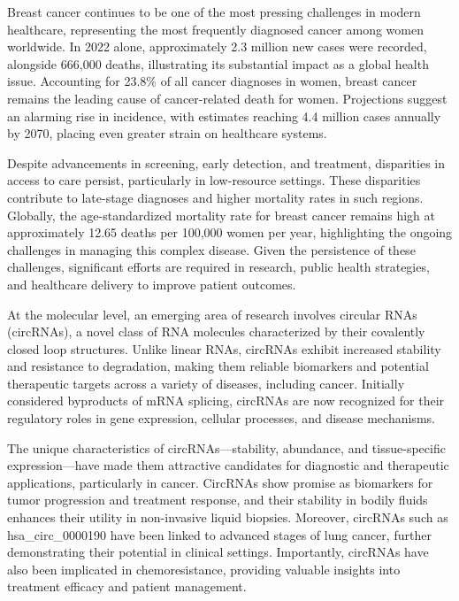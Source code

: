 Breast cancer continues to be one of the most pressing challenges in modern
healthcare, representing the most frequently diagnosed cancer among women
worldwide.
In 2022 alone, approximately 2.3 million new cases were recorded, alongside
666,000 deaths, illustrating its substantial impact as a global health issue.
Accounting for 23.8\% of all cancer diagnoses in
women\supercite{bray_global_2024,ferlay_global_2024}, breast cancer remains the
leading cause of cancer-related death for women.
Projections suggest an alarming rise in incidence, with estimates reaching 4.4
million cases annually by 2070, placing even greater strain on healthcare
systems\supercite{lei_global_2021}.

Despite advancements in screening, early detection, and treatment, disparities
in access to care persist, particularly in low-resource settings.
These disparities contribute to late-stage diagnoses and higher mortality rates
in such regions\supercite{wilkinson_understanding_2022,ginsburg_breast_2020}.
Globally, the age-standardized mortality rate for breast cancer remains high at
approximately 12.65 deaths per 100,000 women per year, highlighting the ongoing
challenges in managing this complex
disease\supercite{bray_global_2024,ferlay_global_2024}.
Given the persistence of these challenges, significant efforts are required in
research, public health strategies, and healthcare delivery to improve patient
outcomes\supercite{desantis_breast_2019}.

At the molecular level, an emerging area of research involves circular RNAs
(circRNAs), a novel class of RNA molecules characterized by their covalently
closed loop structures.
Unlike linear RNAs, circRNAs exhibit increased stability and resistance to
degradation, making them reliable biomarkers and potential therapeutic targets
across a variety of diseases, including
cancer\supercite{ma_circular_2020,hoque_exploring_2023,wilusz_circular_2017}.
Initially considered byproducts of mRNA splicing, circRNAs are now recognized
for their regulatory roles in gene expression, cellular processes, and disease
mechanisms\supercite{cherubini_foxp1_2019,wilusz_360_2018}.

The unique characteristics of circRNAs—stability, abundance, and
tissue-specific expression—have made them attractive candidates for diagnostic
and therapeutic applications, particularly in cancer.
CircRNAs show promise as biomarkers for tumor progression and treatment
response\supercite{bao_prognostic_2020,ren_construction_2017}, and their
stability in bodily fluids enhances their utility in non-invasive liquid
biopsies\supercite{bao_prognostic_2020,zhang_circular_2018}.
Moreover, circRNAs such as hsa\_circ\_0000190 have been linked to advanced
stages of lung cancer, further demonstrating their potential in clinical
settings\supercite{luo_plasma_2020}.
Importantly, circRNAs have also been implicated in chemoresistance, providing
valuable insights into treatment efficacy and patient
management\supercite{geng_function_2018,feng_functions_2019}.

